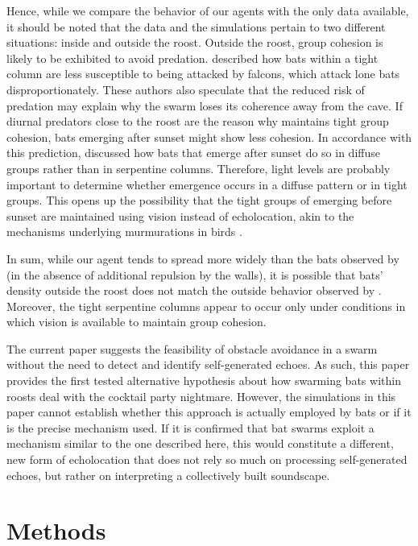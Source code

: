 \documentclass[a4paper, 11pt]{article}
\begin{document}
Hence, while we compare the behavior of our agents with the only data available, it should be noted that the data and the simulations pertain to two different situations: inside and outside the roost. Outside the roost, group cohesion is likely to be exhibited to avoid predation. \citet{Brighton2021} described how bats within a tight column are less susceptible to being attacked by falcons, which attack lone bats disproportionately. These authors also speculate that the reduced risk of predation may explain why the swarm loses its coherence away from the cave. If diurnal predators close to the roost are the reason why  maintains tight group cohesion, bats emerging after sunset might show less cohesion. In accordance with this prediction, \citet{Wilkins1989} discussed how bats that emerge after sunset do so in diffuse groups rather than in serpentine columns. Therefore, light levels are probably important to determine whether emergence occurs in a diffuse pattern or in tight groups. This opens up the possibility that the tight groups of  emerging before sunset are maintained using vision instead of echolocation, akin to the mechanisms underlying murmurations in birds \citep[e.g.,][]{Ballerini2008,Pearce2014}.

In sum, while our agent tends to spread more widely than the bats observed by \citet{Weesner2023} (in the absence of additional repulsion by the walls), it is possible that bats' density outside the roost does not match the outside behavior observed by \citet{Weesner2023}. Moreover, the tight serpentine columns appear to occur only under conditions in which vision is available to maintain group cohesion.

The current paper suggests the feasibility of obstacle avoidance in a swarm without the need to detect and identify self-generated echoes. As such, this paper provides the first tested alternative hypothesis about how swarming bats within roosts deal with the cocktail party nightmare. However, the simulations in this paper cannot establish whether this approach is actually employed by bats or if it is the precise mechanism used. If it is confirmed that bat swarms exploit a mechanism similar to the one described here, this would constitute a different, new form of echolocation that does not rely so much on processing self-generated echoes, but rather on interpreting a collectively built soundscape.

\section{Methods}
\end{document}
